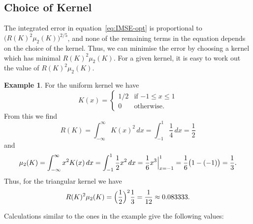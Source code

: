 \documentclass[
  a4paper,
]{article}
\theoremstyle{definition}
\theoremstyle{definition}
\newtheorem{example}{Example}[section]
\theoremstyle{definition}
\theoremstyle{definition}
\theoremstyle{remark}
\begin{document}
\hypertarget{choice-of-kernel}{%
\subsection{Choice of Kernel}\label{choice-of-kernel}}

The integrated error in equation~\eqref{eq:IMSE-opt} is proportional to
\(\bigl( R(K)^2 \mu_2(K) \bigr)^{2/5}\), and none of the remaining terms in
the equation depends on the choice of the kernel. Thus, we can minimise
the error by choosing a kernel which has minimal \(R(K)^2 \mu_2(K)\).
For a given kernel, it is easy to work out the value of \(R(K)^2 \mu_2(K)\).

\begin{example}
For the uniform kernel we have
\begin{equation*}
  K(x)
  = \begin{cases}
      1/2 & \mbox{if $-1 \leq x \leq 1$} \\
      0 & \mbox{otherwise.}
    \end{cases}
\end{equation*}
From this we find
\begin{equation*}
  R(K)
  = \int_{-\infty}^\infty K(x)^2 \,dx
  = \int_{-1}^1 \frac14 \,dx
  = \frac12
\end{equation*}
and
\begin{equation*}
  \mu_2(K)
  = \int_{-\infty}^\infty x^2 K(x) \,dx
  = \int_{-1}^1 \frac12 x^2 \,dx
  = \frac16 \Bigl. x^3 \Bigr|_{x=-1}^1
  = \frac16 \bigl( 1 - (-1) \bigr)
  = \frac13.
\end{equation*}
Thus, for the triangular kernel we have
\begin{equation*}
  R(K)^2 \mu_2(K)
  = \Bigl( \frac12 \Bigr)^2 \frac13
  = \frac{1}{12}
  \approx 0.083333.
\end{equation*}
\end{example}

Calculations similar to the ones in the example give the following
values:
\end{document}
